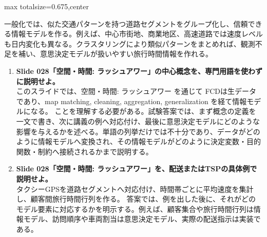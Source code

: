 \begin{adjustbox}{max totalsize={\textwidth}{0.675\textheight},center}
\begin{minipage}{\textwidth}
\begin{minipage}[t]{0.485\textwidth}
一般化では、似た交通パターンを持つ道路セグメントをグループ化し、信頼できる情報モデルを作る。例えば、中心市街地、商業地区、高速道路では速度レベルも日内変化も異なる。クラスタリングにより類似パターンをまとめれば、観測不足を補い、意思決定モデルが扱いやすい旅行時間情報を作れる。\par
{}
\begin{enumerate}
\item \textbf{Slide 028「空間・時間: ラッシュアワー」の中心概念を、専門用語を使わずに説明せよ。}\\このスライドでは、空間・時間: ラッシュアワー を通じて FCDは生データであり、map matching, cleaning, aggregation, generalization を経て情報モデルになる。 ことを理解する必要がある。試験答案では、まず概念の定義を一文で書き、次に講義の例へ対応付け、最後に意思決定モデルにどのような影響を与えるかを述べる。単語の列挙だけでは不十分であり、データがどのように情報モデルへ変換され、その情報モデルがどのように決定変数・目的関数・制約へ接続されるかまで説明する。
\item \textbf{Slide 028「空間・時間: ラッシュアワー」を、配送またはTSPの具体例で説明せよ。}\\タクシーGPSを道路セグメントへ対応付け、時間帯ごとに平均速度を集計し、顧客間旅行時間行列を作る。 答案では、例を出した後に、それがどのモデル要素に対応するかを明示する。例えば、顧客集合や旅行時間行列は情報モデル、訪問順序や車両割当は意思決定モデル、実際の配送指示は実装である。
\end{enumerate}
\end{minipage}
\end{minipage}
\end{adjustbox}

